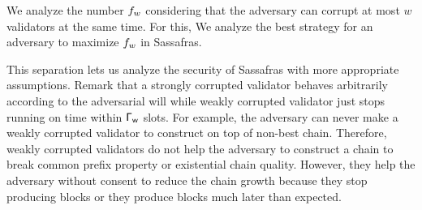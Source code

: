 We analyze the number $ f_{w} $ considering that the adversary can corrupt at most $ w $ validators at the same time. For this, We analyze the best strategy for an adversary to maximize $ f_{w} $ in Sassafras.



This separation lets us analyze the security of Sassafras with more appropriate assumptions. Remark that a strongly corrupted validator behaves arbitrarily according to the adversarial will while weakly corrupted validator just stops running on time within $ \mathsf{\Gamma_{w}} $ slots. For example, the adversary can never make a weakly corrupted validator to construct on top of non-best chain. Therefore, weakly corrupted validators do not help  the adversary to construct a chain to break common prefix property or existential chain quality.  However, they help the adversary without consent to reduce the chain growth because they stop producing blocks or they produce blocks much later than expected.




